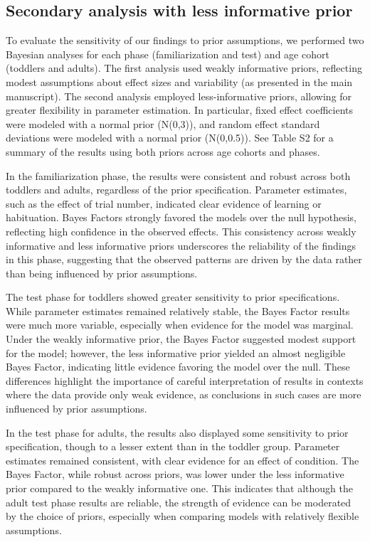 \documentclass[
  man, donotrepeattitle,floatsintext]{apa6}
\begin{document}
\subsection{Secondary analysis with less informative prior}\label{secondary-analysis-with-less-informative-prior}

To evaluate the sensitivity of our findings to prior assumptions, we performed two Bayesian analyses for each phase (familiarization and test) and age cohort (toddlers and adults). The first analysis used weakly informative priors, reflecting modest assumptions about effect sizes and variability (as presented in the main manuscript). The second analysis employed less-informative priors, allowing for greater flexibility in parameter estimation. In particular, fixed effect coefficients were modeled with a normal prior (N(0,3)), and random effect standard deviations were modeled with a normal prior (N(0,0.5)). See Table S2 for a summary of the results using both priors across age cohorts and phases.

In the familiarization phase, the results were consistent and robust across both toddlers and adults, regardless of the prior specification. Parameter estimates, such as the effect of trial number, indicated clear evidence of learning or habituation. Bayes Factors strongly favored the models over the null hypothesis, reflecting high confidence in the observed effects. This consistency across weakly informative and less informative priors underscores the reliability of the findings in this phase, suggesting that the observed patterns are driven by the data rather than being influenced by prior assumptions.

The test phase for toddlers showed greater sensitivity to prior specifications. While parameter estimates remained relatively stable, the Bayes Factor results were much more variable, especially when evidence for the model was marginal. Under the weakly informative prior, the
Bayes Factor suggested modest support for the model; however, the less informative prior yielded an almost negligible Bayes Factor, indicating little evidence favoring the model over the null. These differences highlight the importance of careful interpretation of results in contexts where the data provide only weak evidence, as conclusions in such cases are more influenced by prior assumptions.

In the test phase for adults, the results also displayed some sensitivity to prior specification, though to a lesser extent than in the toddler group. Parameter estimates remained consistent, with clear evidence for an effect of condition. The Bayes Factor, while robust across priors, was lower under the less informative prior compared to the weakly informative one. This indicates that although the adult test phase results are reliable, the strength of evidence can be moderated by the choice of priors, especially when comparing models with relatively flexible assumptions.
\end{document}
